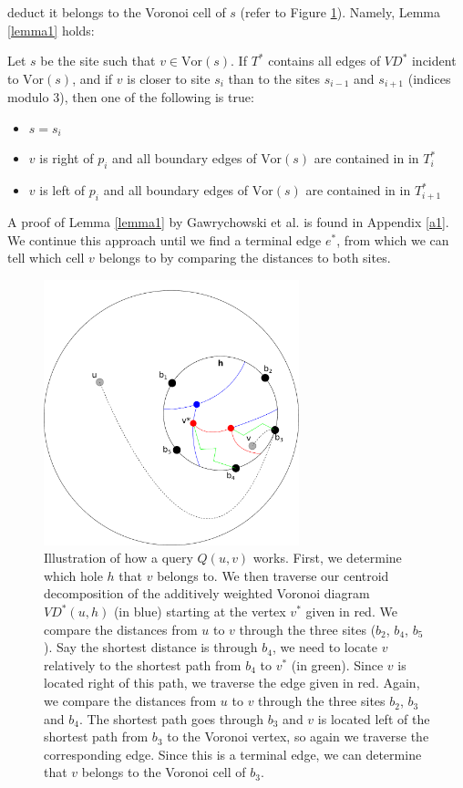 deduct it belongs to the Voronoi cell of $s$ (refer to Figure \ref{vd1}). Namely, Lemma
\ref{lemma1} holds:
\begin{lemma}\label{lemma1}
  Let $s$ be the site such that $v\in \text{Vor}(s)$. If $T^*$ contains all edges of
  $VD^*$ incident to $\text{Vor}(s)$, and if $v$ is closer to site $s_i$ than to the
  sites $s_{i-1}$ and $s_{i+1}$ (indices modulo $3$), then one of the following is true:
  \begin{itemize}
    \item $s=s_i$
    \item $v$ is right of $p_i$ and all boundary edges of $\text{Vor}(s)$ are contained
      in in $T_i^*$
    \item $v$ is left of $p_i$ and all boundary edges of $\text{Vor}(s)$ are contained
      in in $T_{i+1}^*$
  \end{itemize}
\end{lemma}
\noindent A proof of Lemma \ref{lemma1} by Gawrychowski et al. \cite{gawrychowski2017better} is
found in Appendix \ref{a1}. \\
We continue this approach until we find a
terminal edge $e^*$, from which we can tell which cell $v$ belongs to by comparing the
distances to both sites.

\begin{figure}[h!]
  \centering
  \includegraphics[width=0.66\textwidth]{figs/vd1.pdf}
  \caption{Illustration of how a query $Q(u,v)$ works. First, we determine which hole $h$
    that $v$
  belongs to. We then traverse our centroid decomposition of the
  additively weighted Voronoi diagram $VD^*(u,h)$ (in blue) starting at the vertex $v^*$ given in
red. We compare the distances from $u$ to $v$ through the three sites ($b_2$, $b_4$,
$b_5$). Say the shortest distance is through $b_4$, we need to locate $v$ relatively to
the shortest path from $b_4$ to $v^*$ (in green). Since $v$ is
located right of this path, we traverse the edge given in red. Again, we compare the
distances from $u$ to $v$ through the three sites $b_2$, $b_3$ and $b_4$. The shortest
path goes through $b_3$ and $v$ is located left of the shortest path from $b_3$ to the
Voronoi vertex, so again we traverse the corresponding edge. Since this is a terminal
edge, we can determine that $v$ belongs to the Voronoi cell of $b_3$.}
    \label{vd1}
\end{figure}

